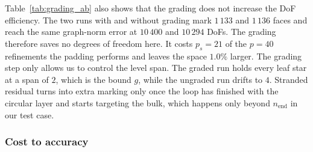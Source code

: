 \documentclass[a4paper, 12pt]{article}
\newcommand{\laststep}{{n_{\mathrm{end}}}}                      %
\newcommand{\totalDoFs}[1]{N\!\left(#1\right)}
\theoremstyle{definition}
\theoremstyle{plain}
\numberwithin{equation}{section}
\begin{document}
Table~\ref{tab:grading_ab} also shows that the grading does not increase the DoF efficiency. The two runs with and without grading mark $1\,133$ and $1\,136$ faces and reach the same graph-norm error at $10\,400$ and $10\,294$ DoFs. The grading therefore saves no degrees of freedom here. It costs $p_s = 21$ of the $p = 40$ refinements the padding performs and leaves the space $1.0\%$ larger. The grading step only allows us to control the level span. The graded run holds every leaf star at a span of $2$, which is the bound $g$, while the ungraded run drifts to $4$. Stranded residual turns into extra marking only once the loop has finished with the circular layer and starts targeting the bulk, which happens only beyond $\laststep$ in our test case.

\FloatBarrier

\subsubsection{Cost to accuracy}
\label{subsubsec:cl_cost}
\end{document}
